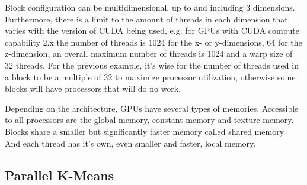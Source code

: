 Block configuration can be multidimensional, up to and including 3 dimensions. Furthermore, there is a limit to the amount of threads in each dimension that varies with the version of CUDA being used, e.g. for GPUs with CUDA compute capability 2.x  the number of threads is 1024 for the x- or y-dimensions, 64 for the z-dimension, an overall maximum number of threads is 1024 and a warp size of 32 threads. For the previous example, it's wise for the number of threads used in a block to be a multiple of 32 to maximize processor utilization, otherwise some blocks will have processors that will do no work.

Depending on the architecture, GPUs have several types of memories. Accessible to all processors are the global memory, constant memory and texture memory. Blocks share a smaller but significantly faster memory called shared memory. And each thread has it's own, even smaller and faster, local memory.








\subsection{Parallel K-Means}

